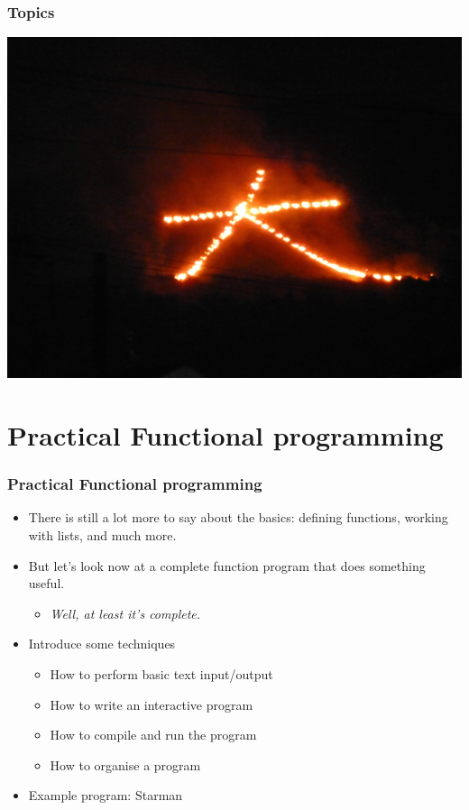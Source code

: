 \documentclass{beamer}
\begin{document}
\begin{frame}[fragile]
  \PresentationTitleSlide
\end{frame}

\begin{frame}[fragile]
  \frametitle{Topics}
  \tableofcontents
\end{frame}
\begin{frame}[fragile]
\begin{center}
\includegraphics[scale=0.075]
	{figures/jpg/pic03a.jpg}
\end{center}
\end{frame}
\section{Practical Functional programming}

\begin{frame}[fragile]
\frametitle{Practical Functional programming}

\begin{itemize}
\item There is still a lot more to say about the basics: defining
  functions, working with lists, and much more.
\item But let's look now at a complete function program that does
  something useful.
  \begin{itemize}
  \item \emph{Well, at least it's complete.}
  \end{itemize}
\item Introduce some techniques
  \begin{itemize}
  \item How to perform basic text input/output
  \item How to write an interactive program
  \item How to compile and run the program 
  \item How to organise a program
  \end{itemize}
\item Example program: Starman
\end{itemize}

\end{frame}
\end{document}
